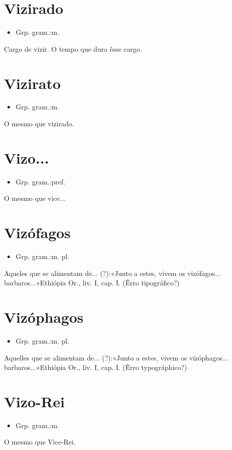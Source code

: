 \documentclass{article}
\begin{document}
\section{Vizirado}
\begin{itemize}
\item {Grp. gram.:m.}
\end{itemize}
Cargo de vizir.
O tempo que dura êsse cargo.
\section{Vizirato}
\begin{itemize}
\item {Grp. gram.:m.}
\end{itemize}
O mesmo que \textunderscore vizirado\textunderscore .
\section{Vizo...}
\begin{itemize}
\item {Grp. gram.:pref.}
\end{itemize}
O mesmo que \textunderscore vice...\textunderscore 
\section{Vizófagos}
\begin{itemize}
\item {Grp. gram.:m. pl.}
\end{itemize}
Aqueles que se alimentam de... (?):«\textunderscore Junto a estes, vivem os vizófagos... barbaros...\textunderscore »\textunderscore Ethiópia Or.\textunderscore , liv. I, cap. I.
(Êrro tipográfico?)
\section{Vizóphagos}
\begin{itemize}
\item {Grp. gram.:m. pl.}
\end{itemize}
Aquelles que se alimentam de... (?):«\textunderscore Junto a estes, vivem os vizóphagos... barbaros...\textunderscore »\textunderscore Ethiópia Or.\textunderscore , liv. I, cap. I.
(Êrro typográphico?)
\section{Vizo-Rei}
\begin{itemize}
\item {Grp. gram.:m.}
\end{itemize}
O mesmo que \textunderscore Vice-Rei\textunderscore .
\end{document}
